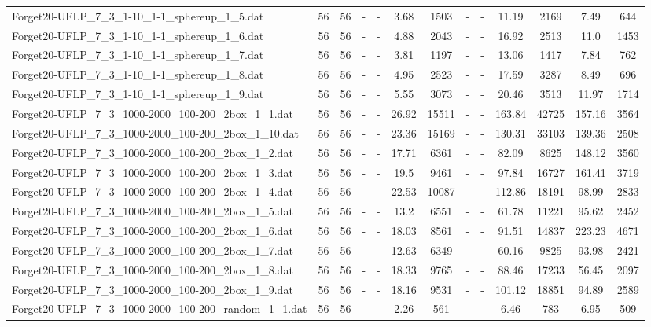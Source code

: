 \begin{table}[!ht]
{\begin{tabular}{lcccccccccccc}
Forget20-UFLP\_7\_3\_1-10\_1-1\_sphereup\_1\_5.dat & 56 & 56 &  - &  - & 3.68 & 1503 &  - &  - & 11.19 & 2169 & 7.49 & 644 \\
Forget20-UFLP\_7\_3\_1-10\_1-1\_sphereup\_1\_6.dat & 56 & 56 &  - &  - & 4.88 & 2043 &  - &  - & 16.92 & 2513 & 11.0 & 1453 \\
Forget20-UFLP\_7\_3\_1-10\_1-1\_sphereup\_1\_7.dat & 56 & 56 &  - &  - & 3.81 & 1197 &  - &  - & 13.06 & 1417 & 7.84 & 762 \\
Forget20-UFLP\_7\_3\_1-10\_1-1\_sphereup\_1\_8.dat & 56 & 56 &  - &  - & 4.95 & 2523 &  - &  - & 17.59 & 3287 & 8.49 & 696 \\
Forget20-UFLP\_7\_3\_1-10\_1-1\_sphereup\_1\_9.dat & 56 & 56 &  - &  - & 5.55 & 3073 &  - &  - & 20.46 & 3513 & 11.97 & 1714 \\
Forget20-UFLP\_7\_3\_1000-2000\_100-200\_2box\_1\_1.dat & 56 & 56 &  - &  - & 26.92 & 15511 &  - &  - & 163.84 & 42725 & 157.16 & 3564 \\
Forget20-UFLP\_7\_3\_1000-2000\_100-200\_2box\_1\_10.dat & 56 & 56 &  - &  - & 23.36 & 15169 &  - &  - & 130.31 & 33103 & 139.36 & 2508 \\
Forget20-UFLP\_7\_3\_1000-2000\_100-200\_2box\_1\_2.dat & 56 & 56 &  - &  - & 17.71 & 6361 &  - &  - & 82.09 & 8625 & 148.12 & 3560 \\
Forget20-UFLP\_7\_3\_1000-2000\_100-200\_2box\_1\_3.dat & 56 & 56 &  - &  - & 19.5 & 9461 &  - &  - & 97.84 & 16727 & 161.41 & 3719 \\
Forget20-UFLP\_7\_3\_1000-2000\_100-200\_2box\_1\_4.dat & 56 & 56 &  - &  - & 22.53 & 10087 &  - &  - & 112.86 & 18191 & 98.99 & 2833 \\
Forget20-UFLP\_7\_3\_1000-2000\_100-200\_2box\_1\_5.dat & 56 & 56 &  - &  - & 13.2 & 6551 &  - &  - & 61.78 & 11221 & 95.62 & 2452 \\
Forget20-UFLP\_7\_3\_1000-2000\_100-200\_2box\_1\_6.dat & 56 & 56 &  - &  - & 18.03 & 8561 &  - &  - & 91.51 & 14837 & 223.23 & 4671 \\
Forget20-UFLP\_7\_3\_1000-2000\_100-200\_2box\_1\_7.dat & 56 & 56 &  - &  - & 12.63 & 6349 &  - &  - & 60.16 & 9825 & 93.98 & 2421 \\
Forget20-UFLP\_7\_3\_1000-2000\_100-200\_2box\_1\_8.dat & 56 & 56 &  - &  - & 18.33 & 9765 &  - &  - & 88.46 & 17233 & 56.45 & 2097 \\
Forget20-UFLP\_7\_3\_1000-2000\_100-200\_2box\_1\_9.dat & 56 & 56 &  - &  - & 18.16 & 9531 &  - &  - & 101.12 & 18851 & 94.89 & 2589 \\
Forget20-UFLP\_7\_3\_1000-2000\_100-200\_random\_1\_1.dat & 56 & 56 &  - &  - & 2.26 & 561 &  - &  - & 6.46 & 783 & 6.95 & 509 \\

\end{tabular}}
\end{table}
